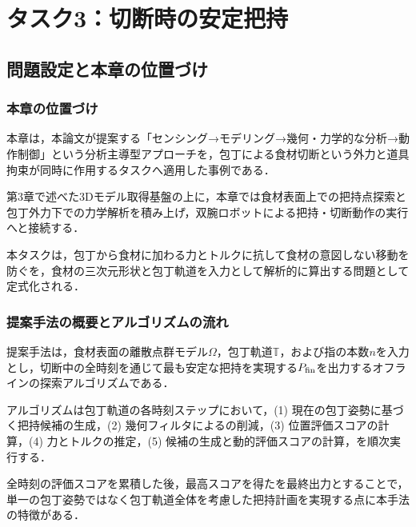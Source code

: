 \chapter{タスク3：切断時の安定把持}
\label{ch:holding}

\section{問題設定と本章の位置づけ}
\label{sec:holding_problem_and_role}

\subsection{本章の位置づけ}
\label{subsec:holding_position}

本章は，本論文が提案する「センシング→モデリング→幾何・力学的な分析→動作制御」という分析主導型アプローチを，包丁による食材切断という外力と道具拘束が同時に作用するタスクへ適用した事例である．

第3章で述べた3Dモデル取得基盤の上に，本章では食材表面上での把持点探索と包丁外力下での力学解析を積み上げ，双腕ロボットによる把持・切断動作の実行へと接続する．

本タスクは，包丁から食材に加わる力とトルクに抗して食材の意図しない移動を防ぐ{\nameholdingpointset}を，食材の三次元形状と包丁軌道を入力として解析的に算出する問題として定式化される．


\subsection{提案手法の概要とアルゴリズムの流れ}
\label{subsec:holding_method_overview}

提案手法は，食材表面の離散点群モデル$\Omega$，包丁軌道$\mathbb{T}$，および指の本数$n$を入力とし，切断中の全時刻を通じて最も安定な把持を実現する{\nameholdingpointset}$\equholdingpointset[fin]$を出力するオフラインの探索アルゴリズムである．

アルゴリズムは包丁軌道の各時刻ステップにおいて，(1) 現在の包丁姿勢に基づく把持候補の生成，(2) 幾何フィルタによる{\namesearchspace}の削減，(3) 位置評価スコアの計算，(4) 力とトルクの推定，(5) {\namegraspforce}候補の生成と動的評価スコアの計算，を順次実行する．

全時刻の評価スコアを累積した後，最高スコアを得た{\nameholdingpointset}を最終出力とすることで，単一の包丁姿勢ではなく包丁軌道全体を考慮した把持計画を実現する点に本手法の特徴がある．


